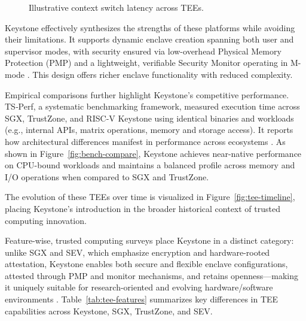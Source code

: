 \begin{figure}[htbp]
\centering
{}
\caption{Illustrative context switch latency across TEEs.}
\label{fig:ctx-overhead}
\end{figure}

Keystone effectively synthesizes the strengths of these platforms while avoiding their limitations. It supports dynamic enclave creation spanning both user and supervisor modes, with security ensured via low-overhead Physical Memory Protection (PMP) and a lightweight, verifiable Security Monitor operating in M-mode \cite{Lee2019}. This design offers richer enclave functionality with reduced complexity.

Empirical comparisons further highlight Keystone’s competitive performance. TS‑Perf, a systematic benchmarking framework, measured execution time across SGX, TrustZone, and RISC‑V Keystone using identical binaries and workloads (e.g., internal APIs, matrix operations, memory and storage access). It reports how architectural differences manifest in performance across ecosystems \cite{turn0search5}. As shown in Figure~\ref{fig:bench-compare}, Keystone achieves near-native performance on CPU-bound workloads and maintains a balanced profile across memory and I/O operations when compared to SGX and TrustZone.

The evolution of these TEEs over time is visualized in Figure~\ref{fig:tee-timeline}, placing Keystone's introduction in the broader historical context of trusted computing innovation.

Feature-wise, trusted computing surveys place Keystone in a distinct category: unlike SGX and SEV, which emphasize encryption and hardware-rooted attestation, Keystone enables both secure and flexible enclave configurations, attested through PMP and monitor mechanisms, and retains openness—making it uniquely suitable for research-oriented and evolving hardware/software environments \cite{turn0search9}. Table~\ref{tab:tee-features} summarizes key differences in TEE capabilities across Keystone, SGX, TrustZone, and SEV.


